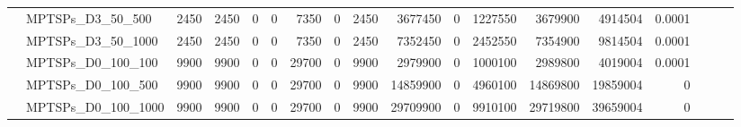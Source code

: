 \begin{landscape}
\begin{longtable}[c]{llrrrrrrrrrrrrrlll}
		& MPTSPs\_D3\_50\_500          & 2450                        & 2450                       & 0                          & 0                           & 7350                       & 0                          & 2450                       & 3677450                   & 0                         & 1227550                    & 3679900                    & 4914504                        & 0.0001                        &                          &                          &                          \\
		& MPTSPs\_D3\_50\_1000         & 2450                        & 2450                       & 0                          & 0                           & 7350                       & 0                          & 2450                       & 7352450                   & 0                         & 2452550                    & 7354900                    & 9814504                        & 0.0001                        &                          &                          &                          \\
		& MPTSPs\_D0\_100\_100         & 9900                        & 9900                       & 0                          & 0                           & 29700                      & 0                          & 9900                       & 2979900                   & 0                         & 1000100                    & 2989800                    & 4019004                        & 0.0001                        &                          &                          &                          \\
		& MPTSPs\_D0\_100\_500         & 9900                        & 9900                       & 0                          & 0                           & 29700                      & 0                          & 9900                       & 14859900                  & 0                         & 4960100                    & 14869800                   & 19859004                       & 0                             &                          &                          &                          \\
		& MPTSPs\_D0\_100\_1000        & 9900                        & 9900                       & 0                          & 0                           & 29700                      & 0                          & 9900                       & 29709900                  & 0                         & 9910100                    & 29719800                   & 39659004                       & 0                             &                          &                          &                          \\

\end{longtable}
\end{landscape}
